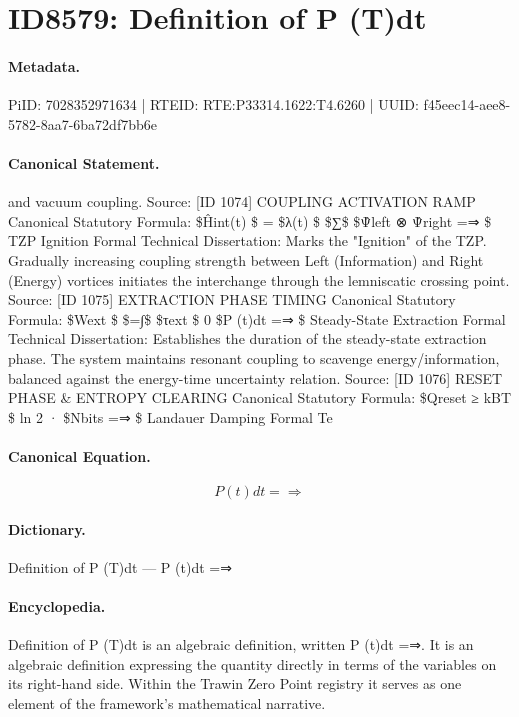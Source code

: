 \section*{ID8579: Definition of P (T)dt}
\paragraph{Metadata.}
PiID: 7028352971634 | RTEID: RTE:P33314.1622:T4.6260 | UUID: f45eec14-aee8-5782-8aa7-6ba72df7bb6e

\paragraph{Canonical Statement.}
and vacuum coupling. Source: [ID 1074] COUPLING ACTIVATION RAMP Canonical Statutory Formula: \$Ĥint(t) \$ = \$λ(t) \$ \$∑\$ \$Ψ̂left ⊗ Ψ̂right =⇒ \$ TZP Ignition Formal Technical Dissertation: Marks the "Ignition" of the TZP. Gradually increasing coupling strength between Left (Information) and Right (Energy) vortices initiates the interchange through the lemniscatic crossing point. Source: [ID 1075] EXTRACTION PHASE TIMING Canonical Statutory Formula: \$Wext \$ \$=∫\$ \$τext \$ 0 \$P (t)dt =⇒ \$ Steady-State Extraction Formal Technical Dissertation: Establishes the duration of the steady-state extraction phase. The system maintains resonant coupling to scavenge energy/information, balanced against the energy-time uncertainty relation. Source: [ID 1076] RESET PHASE \& ENTROPY CLEARING Canonical Statutory Formula: \$Qreset ≥ kBT \$ ln 2 · \$Nbits =⇒ \$ Landauer Damping Formal Te

\paragraph{Canonical Equation.}
\[
P (t)dt =⇒
\]

\paragraph{Dictionary.}
Definition of P (T)dt — P (t)dt =⇒

\paragraph{Encyclopedia.}
Definition of P (T)dt is an algebraic definition, written P (t)dt =⇒. It is an algebraic definition expressing the quantity directly in terms of the variables on its right-hand side. Within the Trawin Zero Point registry it serves as one element of the framework's mathematical narrative.
